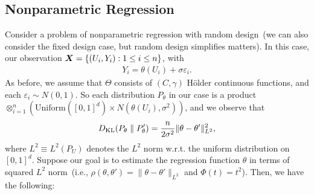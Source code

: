 \documentclass[12pt]{article}
\begin{document}
\subsection{Nonparametric Regression}
\label{subsec:nonparametric-regression}

Consider a problem of nonparametric regression with random design~(we can also consider the fixed design case, but random design simplifies matters). In this case, our observation ${\boldsymbol X} = \{ (U_i,Y_i):  1 \leq i \leq n\}$, with 
\begin{align}
	Y_i = \theta(U_i) + \sigma \varepsilon_i. 
\end{align}
As before, we assume that $\Theta$ consists of $(C, \gamma)$ H\"older continuous functions, and each $\varepsilon_i \sim N(0, 1)$. 
So each distribution $P_{\theta}$ in our case is a product $\otimes_{i=1}^n (\mathrm{Uniform}([0,1]^d) \times N(\theta(U_i), \sigma^2))$, and we observe that 
\begin{align}
	D_{\text{KL}}(P_\theta \parallel P_\theta') = \frac{n}{2\sigma^2}  \|\theta - \theta'\|_{L^2}^2, \label{eq:nonparametric-regression-1}
\end{align} 
where $L^2 \equiv L^2(P_U)$ denotes the $L^2$ norm w.r.t. the uniform distribution on $[0,1]^d$. Suppose our goal is to estimate the regression function $\theta$ in terms of squared $L^2$ norm~(i.e., $\rho(\theta, \theta') = \|\theta-\theta'\|_{L^2}$ and $\Phi(t) = t^2$). Then, we have the following:
\end{document}
